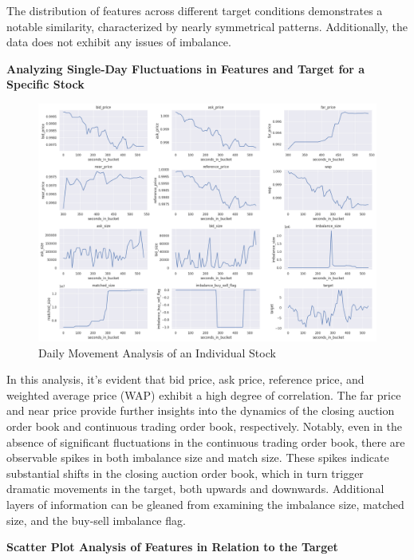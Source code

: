 \documentclass[12pt]{article}
\newtheorem{Proof of Lemma}{Proof of Lemma}
\begin{document}
The distribution of features across different target conditions demonstrates a notable similarity, characterized by nearly symmetrical patterns. Additionally, the data does not exhibit any issues of imbalance.

\noindent \textbf{Analyzing Single-Day Fluctuations in Features and Target for a Specific Stock}

\begin{figure}[H]
  \centering
  \includegraphics[width=1\linewidth]{images/LinePlot.png}
  \caption{Daily Movement Analysis of an Individual Stock}
  \label{fig:SingleDayMovement}
\end{figure}

In this analysis, it's evident that bid price, ask price, reference price, and weighted average price (WAP) exhibit a high degree of correlation. The far price and near price provide further insights into the dynamics of the closing auction order book and continuous trading order book, respectively. Notably, even in the absence of significant fluctuations in the continuous trading order book, there are observable spikes in both imbalance size and match size. These spikes indicate substantial shifts in the closing auction order book, which in turn trigger dramatic movements in the target, both upwards and downwards. Additional layers of information can be gleaned from examining the imbalance size, matched size, and the buy-sell imbalance flag.

\noindent \textbf{Scatter Plot Analysis of Features in Relation to the Target}
\end{document}
